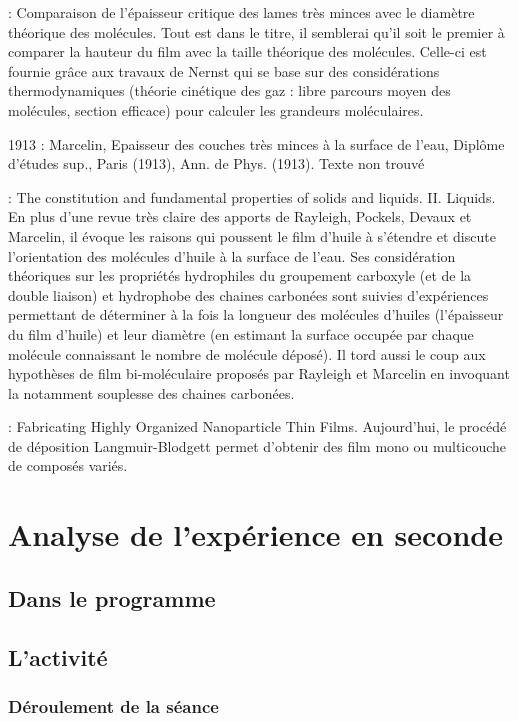 \documentclass[12pt,a4paper]{article}
\begin{document}
\cite{Devaux1904} : Comparaison de l'épaisseur critique des lames très minces avec le diamètre théorique des molécules.
Tout est dans le titre, il semblerai qu'il soit le premier à comparer la hauteur du film avec la taille théorique des molécules.
Celle-ci est fournie grâce aux travaux de Nernst qui se base sur des considérations thermodynamiques (théorie cinétique des gaz : libre parcours moyen des molécules, section efficace) pour calculer les grandeurs moléculaires.

1913 : Marcelin, Epaisseur des couches très minces à la surface de l'eau, Diplôme d'études sup., Paris (1913), Ann. de Phys. (1913). Texte non trouvé

\cite{Langmuir1917} : The constitution and fundamental properties of solids and liquids. II. Liquids.
En plus d'une revue très claire des apports de Rayleigh, Pockels, Devaux et Marcelin, il évoque les raisons qui poussent le film d'huile à s'étendre et discute l'orientation des molécules d'huile à la surface de l'eau.
Ses considération théoriques sur les propriétés hydrophiles du groupement carboxyle (et de la double liaison) et hydrophobe des chaines carbonées sont suivies d'expériences permettant de déterminer à la fois la longueur des molécules d'huiles (l'épaisseur du film d'huile) et leur diamètre (en estimant la surface occupée par chaque molécule connaissant le nombre de molécule déposé).
Il tord aussi le coup aux hypothèses de film bi-moléculaire proposés par Rayleigh et Marcelin en invoquant la notamment souplesse des chaines carbonées.

\cite{BiolinScientific2011} : Fabricating Highly Organized Nanoparticle Thin Films.
Aujourd'hui, le procédé de déposition Langmuir-Blodgett permet d'obtenir des film mono ou multicouche de composés variés.

\section{Analyse de l'expérience en seconde}

\subsection{Dans le programme}

\subsection{L'activité}

\subsubsection{Déroulement de la séance}
\end{document}
